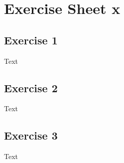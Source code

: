 \documentclass[a4paper,ngerman]{article}
\begin{document}
\section*{Exercise Sheet x}

\vspace{0,75cm}

\subsection*{Exercise 1}
Text

\vspace{0,75cm}

\subsection*{Exercise 2}
Text

\vspace{0,75cm}

\subsection*{Exercise 3}
Text
\end{document}
